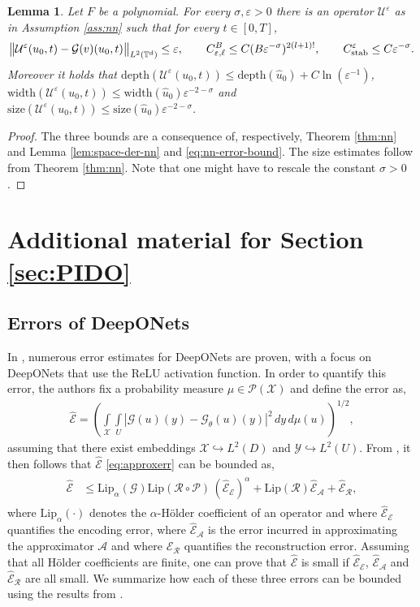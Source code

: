 \documentclass{article}
\numberwithin{equation}{section}
\newcommand{\size}{\mathrm{size}}
\newcommand{\width}{\mathrm{width}}
\newcommand{\depth}{\mathrm{depth}}
\newcommand{\Err}{\widehat{\mathscr{E}}}
\newcommand{\embeds}{{\hookrightarrow}}
\newcommand{\T}{\mathbb{T}}
\newcommand{\G}{\mathcal{G}}
\newcommand{\Lip}{\mathrm{Lip}}
\newcommand{\cA}{\mathcal{A}}
\newcommand{\cE}{\mathcal{E}}
\newcommand{\cG}{\mathcal{G}}
\newcommand{\cP}{\mathcal{P}}
\newcommand{\cR}{\mathcal{R}}
\newcommand{\cU}{\mathcal{U}}
\newcommand{\inspace}{\mathcal{X}}
\newcommand{\outspace}{\mathcal{Y}}
\newcommand{\uhat}{{\widehat{u}}}
\renewcommand{\epsilon}{\varepsilon}
\newcommand{\1}{\mathbbm{1}}
\newtheorem{lemma}[theorem]{Lemma}
\begin{document}
\begin{lemma}\label{lem:ass-check-ac}
Let $F$ be a polynomial. For every $\sigma, \epsilon>0$ there is an operator $\cU^\epsilon$ as in Assumption \ref{ass:nn} such that for every $t\in [0,T]$,
\begin{equation}
    \norm{\cU^\epsilon(u_0,t)-\cG(v)(u_0,t)}_{L^2(\T^d)} \leq \epsilon, \qquad C_{\epsilon,\ell}^B \leq C(B\epsilon^{-\sigma})^{2(l+1)!}, \qquad C^\epsilon_{\mathrm{stab}} \leq C\epsilon^{-\sigma}. 
\end{equation}
Moreover it holds that $\depth(\cU^\epsilon(u_0,t)) \leq \depth(\uhat_0)+C\ln(\epsilon^{-1})$, $\width(\cU^\epsilon(u_0,t)) \leq \width(\uhat_0)\epsilon^{-2-\sigma}$ and $\size(\cU^\epsilon(u_0,t)) \leq \size(\uhat_0)\epsilon^{-2-\sigma}$. 
\end{lemma}
\begin{proof}
The three bounds are a consequence of, respectively, Theorem \ref{thm:nn} and Lemma \ref{lem:space-der-nn} and \eqref{eq:nn-error-bound}. The size estimates follow from Theorem \ref{thm:nn}. Note that one might have to rescale the constant $\sigma>0$.
\end{proof}

\section{Additional material for Section \ref{sec:PIDO}}\label{app:PIDO}

\subsection{Errors of DeepONets}\label{app:error-deeponet}

In \cite{LMK1}, numerous error estimates for DeepONets are proven, with a focus on DeepONets that use the ReLU activation function. In order to quantify this error, the authors fix a probability measure $\mu \in \cP(\inspace)$ and define the error as,
\begin{align} \label{eq:approxerr}
\Err
=
\left(
\int\limits_{\inspace} \int\limits_{U}
\left|
\G(u)(y) 
-
\cG_\theta(u)(y)
\right|^2 
\, dy
\, d\mu(u)
\right)^{1/2},
\end{align}
assuming that there exist embeddings $\inspace \embeds L^2(D)$ and  $\outspace\embeds L^2(U)$. 
From \cite[Lemma 3.4]{LMK1}, it then follows that $\Err$ \eqref{eq:approxerr} can be bounded as,
\begin{gather} \label{eq:error}
\begin{aligned}
\Err 
&\le \Lip_\alpha(\G) \Lip(\cR \circ \cP) \, (\Err_{\cE})^\alpha + \Lip(\cR) \Err_{\cA} + \Err_{\cR}, 
\end{aligned}
\end{gather}
where $\Lip_\alpha(\cdot)$ denotes the $\alpha$-Hölder coefficient of an operator and where $\Err_\cE$ quantifies the encoding error, where $\Err_\cA$ is the error incurred in approximating the approximator $\cA$ and where $\Err_\cR$ quantifies the reconstruction error. Assuming that all Hölder coefficients are finite, one can prove that $\Err$ is small if $\Err_\cE$, $\Err_\cA$ and $\Err_\cR$ are all small. 
We summarize how each of these three errors can be bounded using the results from \cite{LMK1}. 
\end{document}
